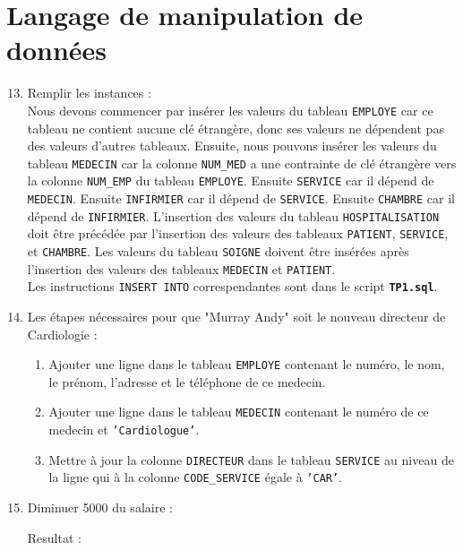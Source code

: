 \documentclass[12pt,a4paper]{article}
\begin{document}
\section{Langage de manipulation de données}
	\begin{enumerate}
		\setcounter{enumi}{12}
		\item Remplir les instances :\\
		Nous devons commencer par insérer les valeurs du tableau \texttt{EMPLOYE} car ce tableau
		ne contient aucune clé étrangère, donc ses valeurs ne dépendent pas des valeurs d'autres
		tableaux. Ensuite, nous pouvons insérer les valeurs du tableau \texttt{MEDECIN} car la colonne \texttt{NUM\_MED}
		a une contrainte de clé étrangère vers la colonne \texttt{NUM\_EMP} du tableau \texttt{EMPLOYE}.
		Ensuite \texttt{SERVICE} car il dépend de \texttt{MEDECIN}. Ensuite \texttt{INFIRMIER} car il
		dépend de \texttt{SERVICE}. Ensuite \texttt{CHAMBRE} car il dépend de \texttt{INFIRMIER}. L'insertion
		des valeurs du tableau \texttt{HOSPITALISATION} doit être précédée par l'insertion des valeurs
		des tableaux \texttt{PATIENT}, \texttt{SERVICE}, et \texttt{CHAMBRE}. Les valeurs du tableau
		\texttt{SOIGNE} doivent être insérées après l'insertion des valeurs des tableaux \texttt{MEDECIN}
		et \texttt{PATIENT}.\\
		Les instructions \texttt{INSERT INTO} correspendantes sont dans le script \texttt{\bfseries TP1.sql}.
		\item Les étapes nécessaires pour que "Murray Andy" soit le nouveau directeur de Cardiologie :
		\begin{enumerate}
			\item Ajouter une ligne dans le tableau \texttt{EMPLOYE} contenant le numéro, le nom, le prénom,
			l'adresse et le téléphone de ce medecin.
			\item Ajouter une ligne dans le tableau \texttt{MEDECIN} contenant le numéro de ce medecin et
			 \texttt{'Cardiologue'}.
			\item Mettre à jour la colonne \texttt{DIRECTEUR} dans le tableau \texttt{SERVICE} au niveau de
			la ligne qui à la colonne \texttt{CODE\_SERVICE} égale à \texttt{'CAR'}.
		\end{enumerate}
		
		\item Diminuer 5000 du salaire :
		
		Resultat :
		\begin{verbatim}

\end{verbatim}
\end{enumerate}
\end{document}
